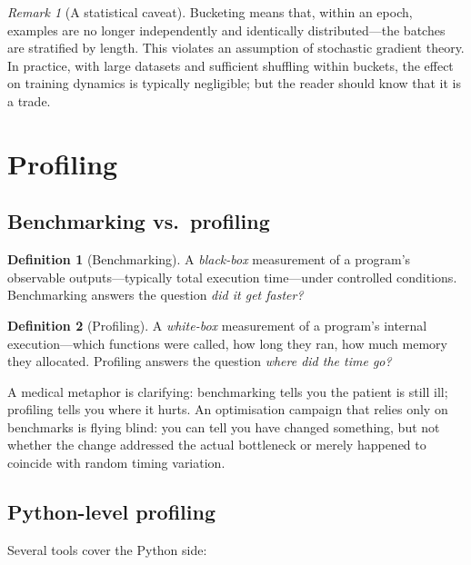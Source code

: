 \documentclass[11pt,a4paper]{article}
\theoremstyle{definition}
\newtheorem{definition}{Definition}[section]
\theoremstyle{remark}
\newtheorem*{remark}{Remark}
\theoremstyle{plain}
\begin{document}
\begin{remark}[A statistical caveat]
Bucketing means that, within an epoch, examples are no longer
independently and identically distributed---the batches are stratified by
length. This violates an assumption of stochastic gradient theory. In
practice, with large datasets and sufficient shuffling within buckets, the
effect on training dynamics is typically negligible; but the reader should
know that it is a trade.
\end{remark}

\section{Profiling}
\label{sec:profiling}

\subsection{Benchmarking vs.\ profiling}

\begin{definition}[Benchmarking]
A \emph{black-box} measurement of a program's observable outputs---typically
total execution time---under controlled conditions. Benchmarking answers
the question \emph{did it get faster?}
\end{definition}

\begin{definition}[Profiling]
A \emph{white-box} measurement of a program's internal execution---which
functions were called, how long they ran, how much memory they allocated.
Profiling answers the question \emph{where did the time go?}
\end{definition}

A medical metaphor is clarifying: benchmarking tells you the patient is
still ill; profiling tells you where it hurts. An optimisation campaign
that relies only on benchmarks is flying blind: you can tell you have
changed something, but not whether the change addressed the actual
bottleneck or merely happened to coincide with random timing variation.

\subsection{Python-level profiling}

Several tools cover the Python side:
\end{document}
